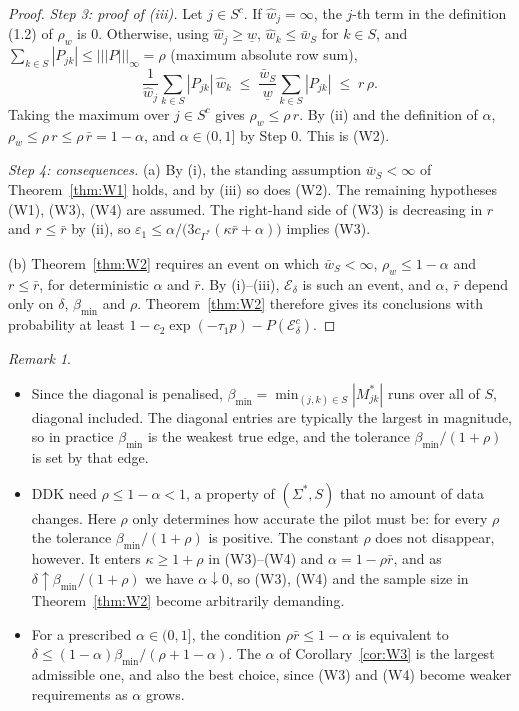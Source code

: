 \documentclass[11pt,a4paper]{article}
\numberwithin{equation}{section}
\theoremstyle{plain}
\theoremstyle{remark}
\newtheorem{remark}[theorem]{Remark}
\begin{document}
\begin{proof}
\emph{Step 3: proof of (iii).}
Let $j \in S^c$. If $\hat w_j = \infty$, the $j$-th term in the definition (1.2) of $\rho_w$
is $0$. Otherwise, using $\hat w_j \ge \underline w$, $\hat w_k \le \bar w_S$ for $k \in S$,
and $\sum_{k\in S}|P_{jk}| \le |||P|||_\infty = \rho$ (maximum absolute row sum),
\[
  \frac{1}{\hat w_j}\sum_{k\in S}|P_{jk}|\,\hat w_k
  \;\le\; \frac{\bar w_S}{\underline w}\sum_{k\in S}|P_{jk}|
  \;\le\; r\,\rho .
\]
Taking the maximum over $j \in S^c$ gives $\rho_w \le \rho\, r$. By (ii) and the definition
of $\alpha$, $\rho_w \le \rho\, r \le \rho\,\bar r = 1 - \alpha$, and $\alpha \in (0,1]$ by
Step 0. This is (W2).

\emph{Step 4: consequences.}
(a) By (i), the standing assumption $\bar w_S < \infty$ of Theorem~\ref{thm:W1} holds, and by
(iii) so does (W2). The remaining hypotheses (W1), (W3), (W4) are assumed. The right-hand side
of (W3) is decreasing in $r$ and $r \le \bar r$ by (ii), so
$\varepsilon_1 \le \alpha/\big(3c_{\Gamma^*}(\kappa\bar r + \alpha)\big)$ implies (W3).

(b) Theorem~\ref{thm:W2} requires an event on which $\bar w_S < \infty$,
$\rho_w \le 1 - \alpha$ and $r \le \bar r$, for deterministic $\alpha$ and $\bar r$.
By (i)--(iii), $\mathcal E_\delta$ is such an event, and $\alpha$, $\bar r$ depend only on
$\delta$, $\beta_{\min}$ and $\rho$. Theorem~\ref{thm:W2} therefore gives its conclusions with
probability at least $1 - c_2\exp(-\tau_1 p) - P(\mathcal E_\delta^c)$.
\end{proof}

\begin{remark}\label{rem:W3}
\begin{itemize}
  \item Since the diagonal is penalised, $\beta_{\min} = \min_{(j,k)\in S}|M^*_{jk}|$ runs over
        all of $S$, diagonal included. The diagonal entries are typically the largest in
        magnitude, so in practice $\beta_{\min}$ is the weakest true edge, and the tolerance
        $\beta_{\min}/(1+\rho)$ is set by that edge.
  \item DDK need $\rho \le 1-\alpha < 1$, a property of $(\Sigma^*, S)$ that no amount of data
        changes. Here $\rho$ only determines how accurate the pilot must be: for every $\rho$
        the tolerance $\beta_{\min}/(1+\rho)$ is positive. The constant $\rho$ does not
        disappear, however. It enters $\kappa \ge 1+\rho$ in (W3)--(W4) and
        $\alpha = 1 - \rho\bar r$, and as $\delta \uparrow \beta_{\min}/(1+\rho)$ we have
        $\alpha \downarrow 0$, so (W3), (W4) and the sample size in Theorem~\ref{thm:W2}
        become arbitrarily demanding.
  \item For a prescribed $\alpha \in (0,1]$, the condition $\rho\bar r \le 1-\alpha$ is
        equivalent to $\delta \le (1-\alpha)\beta_{\min}/(\rho + 1 - \alpha)$. The $\alpha$ of
        Corollary~\ref{cor:W3} is the largest admissible one, and also the best choice, since
        (W3) and (W4) become weaker requirements as $\alpha$ grows.
\end{itemize}
\end{remark}
\end{document}
